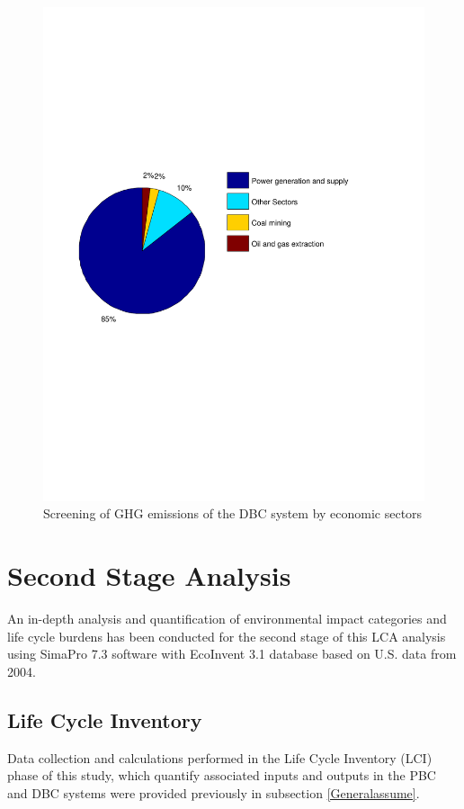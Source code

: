 \documentclass[3p,times,procedia]{elsarticle}
\begin{document}
\begin{figure}[t]
\includegraphics[width=\linewidth]{g.pdf}
\caption{Screening of GHG emissions of the DBC system by economic sectors}
\label{screecn4Sectors}
\endminipage\hfill
\end{figure}

\section{Second Stage Analysis}
An in-depth analysis and quantification of environmental impact categories and life cycle burdens has been conducted for the second stage of this LCA analysis using SimaPro 7.3 software with EcoInvent 3.1 database based on U.S. data from 2004.

\subsection{Life Cycle Inventory}

Data collection and calculations performed in the Life Cycle Inventory (LCI) phase of this study, which quantify associated inputs and outputs in the PBC and DBC systems were provided previously in subsection \ref{Generalassume}.\\
\end{document}
